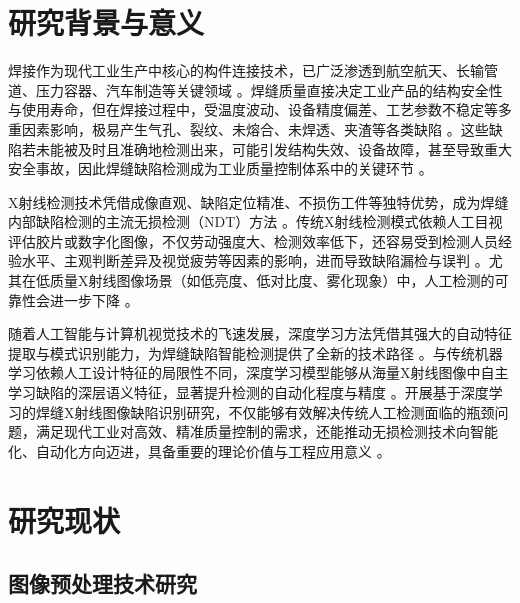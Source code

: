 \documentclass{cjlu_literature_review}
\begin{document}
	\makeopeningcover
	
	\section{研究背景与意义}
	\label{sec:background}
	
	焊接作为现代工业生产中核心的构件连接技术，已广泛渗透到航空航天、长输管道、压力容器、汽车制造等关键领域 \cite{Hu2020_DeepLearningWeldDefect, Zuo2025_EndToEndWeldingDefect, Dai2025_CCBFERCNN}。焊缝质量直接决定工业产品的结构安全性与使用寿命，但在焊接过程中，受温度波动、设备精度偏差、工艺参数不稳定等多重因素影响，极易产生气孔、裂纹、未熔合、未焊透、夹渣等各类缺陷 \cite{Valavanis2010_MulticlassDefectDetection, Zuo2025_EndToEndWeldingDefect}。这些缺陷若未能被及时且准确地检测出来，可能引发结构失效、设备故障，甚至导致重大安全事故，因此焊缝缺陷检测成为工业质量控制体系中的关键环节 \cite{Dai2025_CCBFERCNN, Ajmi2023_FasterRCNNWeldDefects}。
	
	X射线检测技术凭借成像直观、缺陷定位精准、不损伤工件等独特优势，成为焊缝内部缺陷检测的主流无损检测（NDT）方法 \cite{Yu2025_IndustrialDefectRecognition, Mery2015_GDXrayDataset}。传统X射线检测模式依赖人工目视评估胶片或数字化图像，不仅劳动强度大、检测效率低下，还容易受到检测人员经验水平、主观判断差异及视觉疲劳等因素的影响，进而导致缺陷漏检与误判 \cite{Ajmi2023_FasterRCNNWeldDefects, Hou2020_ReviewWeldDefectDetection}。尤其在低质量X射线图像场景（如低亮度、低对比度、雾化现象）中，人工检测的可靠性会进一步下降 \cite{Zuo2025_EndToEndWeldingDefect, Yu2025_IndustrialDefectRecognition}。
	
	随着人工智能与计算机视觉技术的飞速发展，深度学习方法凭借其强大的自动特征提取与模式识别能力，为焊缝缺陷智能检测提供了全新的技术路径 \cite{Hu2020_DeepLearningWeldDefect, Guo2021_ContrastEnhancementGAN}。与传统机器学习依赖人工设计特征的局限性不同，深度学习模型能够从海量X射线图像中自主学习缺陷的深层语义特征，显著提升检测的自动化程度与精度 \cite{Dai2025_CCBFERCNN, He2015_DeepResidualLearning}。开展基于深度学习的焊缝X射线图像缺陷识别研究，不仅能够有效解决传统人工检测面临的瓶颈问题，满足现代工业对高效、精准质量控制的需求，还能推动无损检测技术向智能化、自动化方向迈进，具备重要的理论价值与工程应用意义 \cite{Yu2025_IndustrialDefectRecognition, Chen2018_EncoderDecoderSegmentation}。
	
	\section{研究现状}
	\label{sec:related}
	
	\subsection{图像预处理技术研究}
	
\end{document}
